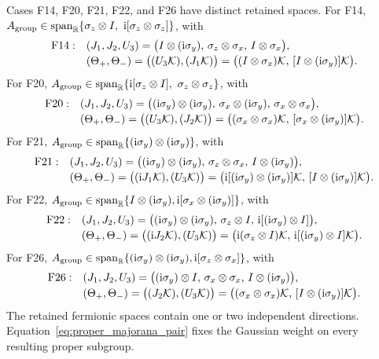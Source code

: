 Cases F14, F20, F21, F22, and F26 have distinct retained spaces.  For F14,
\(A_{\rm group}\in\operatorname{span}_{\mathbb R}
\{\sigma_z\otimes I,\ \mathrm{i}[\sigma_z\otimes\sigma_z]\}\), with
\begin{align*}
\mathrm{F14}:\quad
 &(J_1,J_2,U_3)=
 \bigl(I\otimes(\mathrm{i}\sigma_y),\,
 \sigma_z\otimes\sigma_x,\,I\otimes\sigma_x\bigr),\\[-2pt]
 &(\Theta_+,\Theta_-)=
 \bigl((U_3\mathcal{K}),(J_1\mathcal{K})\bigr)
 =\bigl((I\otimes\sigma_x)\mathcal{K},\,
 [I\otimes(\mathrm{i}\sigma_y)]\mathcal{K}\bigr).
\end{align*}
For F20,
\(A_{\rm group}\in\operatorname{span}_{\mathbb R}
\{\mathrm{i}[\sigma_z\otimes I],\ \sigma_z\otimes\sigma_z\}\), with
\begin{align*}
\mathrm{F20}:\quad
 &(J_1,J_2,U_3)=
 \bigl((\mathrm{i}\sigma_y)\otimes(\mathrm{i}\sigma_y),\,
 \sigma_x\otimes(\mathrm{i}\sigma_y),\,
 \sigma_x\otimes\sigma_x\bigr),\\[-2pt]
 &(\Theta_+,\Theta_-)=
 \bigl((U_3\mathcal{K}),(J_2\mathcal{K})\bigr)
 =\bigl((\sigma_x\otimes\sigma_x)\mathcal{K},\,
 [\sigma_x\otimes(\mathrm{i}\sigma_y)]\mathcal{K}\bigr).
\end{align*}
For F21,
\(A_{\rm group}\in\operatorname{span}_{\mathbb R}
\{(\mathrm{i}\sigma_y)\otimes(\mathrm{i}\sigma_y)\}\), with
\begin{align*}
\mathrm{F21}:\quad
 &(J_1,J_2,U_3)=
 \bigl((\mathrm{i}\sigma_y)\otimes(\mathrm{i}\sigma_y),\,
 \sigma_z\otimes\sigma_x,\,I\otimes(\mathrm{i}\sigma_y)\bigr),\\[-2pt]
 &(\Theta_+,\Theta_-)=
 \bigl((\mathrm{i} J_1\mathcal{K}),(U_3\mathcal{K})\bigr)
 =\bigl(\mathrm{i}[(\mathrm{i}\sigma_y)\otimes(\mathrm{i}\sigma_y)]\mathcal{K},\,
 [I\otimes(\mathrm{i}\sigma_y)]\mathcal{K}\bigr).
\end{align*}
For F22,
\(A_{\rm group}\in\operatorname{span}_{\mathbb R}
\{I\otimes(\mathrm{i}\sigma_y),
\mathrm{i}[\sigma_x\otimes(\mathrm{i}\sigma_y)]\}\), with
\begin{align*}
\mathrm{F22}:\quad
 &(J_1,J_2,U_3)=
 \bigl((\mathrm{i}\sigma_y)\otimes(\mathrm{i}\sigma_y),\,
 \sigma_z\otimes I,\,
 \mathrm{i}[(\mathrm{i}\sigma_y)\otimes I]\bigr),\\[-2pt]
 &(\Theta_+,\Theta_-)=
 \bigl((\mathrm{i} J_2\mathcal{K}),(U_3\mathcal{K})\bigr)
 =\bigl(\mathrm{i}(\sigma_z\otimes I)\mathcal{K},\,
 \mathrm{i}[(\mathrm{i}\sigma_y)\otimes I]\mathcal{K}\bigr).
\end{align*}
For F26,
\(A_{\rm group}\in\operatorname{span}_{\mathbb R}
\{(\mathrm{i}\sigma_y)\otimes(\mathrm{i}\sigma_y),
\mathrm{i}[\sigma_z\otimes\sigma_x]\}\), with
\begin{align*}
\mathrm{F26}:\quad
 &(J_1,J_2,U_3)=
 \bigl((\mathrm{i}\sigma_y)\otimes I,\,
 \sigma_x\otimes\sigma_x,\,
 I\otimes(\mathrm{i}\sigma_y)\bigr),\\[-2pt]
 &(\Theta_+,\Theta_-)=
 \bigl((J_2\mathcal{K}),(U_3\mathcal{K})\bigr)
 =\bigl((\sigma_x\otimes\sigma_x)\mathcal{K},\,
 [I\otimes(\mathrm{i}\sigma_y)]\mathcal{K}\bigr).
\end{align*}
The retained fermionic spaces contain one or two independent directions.
Equation~\eqref{eq:proper_majorana_pair} fixes the Gaussian weight on every
resulting proper subgroup.
